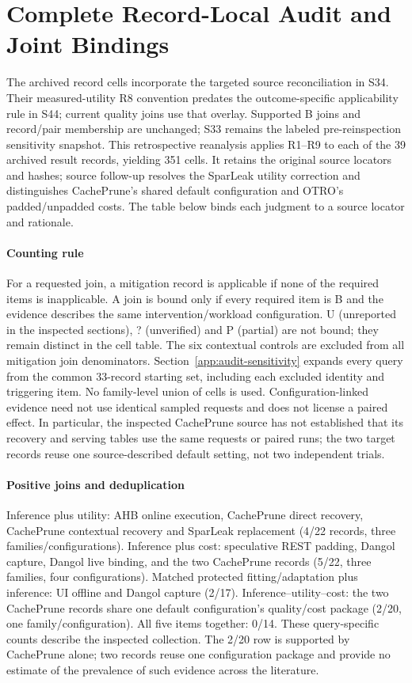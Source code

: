 \section{Complete Record-Local Audit and Joint Bindings}\label{app:record-joins}
The archived record cells incorporate the targeted source reconciliation in S34. Their measured-utility R8 convention predates the outcome-specific applicability rule in S44; current quality joins use that overlay. Supported B joins and record/pair membership are unchanged; S33 remains the labeled pre-reinspection sensitivity snapshot.
This retrospective reanalysis applies R1--R9 to each of the 39 archived result records, yielding 351 cells. It retains the original source locators and hashes; source follow-up resolves the SparLeak utility correction and distinguishes CachePrune's shared default configuration and OTRO's padded/unpadded costs. The table below binds each judgment to a source locator and rationale.

\paragraph{Counting rule}
For a requested join, a mitigation record is applicable if none of the required items is inapplicable. A join is bound only if every required item is B and the evidence describes the same intervention/workload configuration. U (unreported in the inspected sections), ? (unverified) and P (partial) are not bound; they remain distinct in the cell table. The six contextual controls are excluded from all mitigation join denominators. Section~\ref{app:audit-sensitivity} expands every query from the common 33-record starting set, including each excluded identity and triggering item. No family-level union of cells is used. Configuration-linked evidence need not use identical sampled requests and does not license a paired effect. In particular, the inspected CachePrune source has not established that its recovery and serving tables use the same requests or paired runs; the two target records reuse one source-described default setting, not two independent trials.

\paragraph{Positive joins and deduplication}
Inference plus utility: AHB online execution, CachePrune direct recovery, CachePrune contextual recovery and SparLeak replacement (4/22 records, three families/configurations). Inference plus cost: speculative REST padding, Dangol capture, Dangol live binding, and the two CachePrune records (5/22, three families, four configurations). Matched protected fitting/adaptation plus inference: UI offline and Dangol capture (2/17). Inference--utility--cost: the two CachePrune records share one default configuration's quality/cost package (2/20, one family/configuration). All five items together: 0/14. These query-specific counts describe the inspected collection. The 2/20 row is supported by CachePrune alone; two records reuse one configuration package and provide no estimate of the prevalence of such evidence across the literature.

